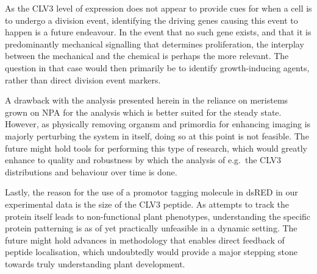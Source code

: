 As the CLV3 level of expression does not appear to provide cues for when a cell
is to undergo a division event, identifying the driving genes causing this
event to happen is a future endeavour. In the event that no such gene exists,
and that it is predominantly mechanical signalling that determines
proliferation, the interplay between the mechanical and the chemical is perhaps
the more relevant. The question in that case would then primarily be to identify
growth-inducing agents, rather than direct division event markers.

A drawback with the analysis presented herein in the reliance on meristems grown
on NPA for the analysis which is better suited for the steady state. However, as
physically removing organsm and primordia for enhancing imaging is majorly
perturbing the system in itself, doing so at this point is not feasible. The
future might hold tools for performing this type of research, which would
greatly enhance to quality and robustness by which the analysis of e.g.\ the
CLV3 distributions and behaviour over time is done.

Lastly, the reason for the use of a promotor tagging molecule in dsRED in our
experimental data is the size of the CLV3 peptide. As attempts to track the protein
itself leads to non-functional plant phenotypes, understanding the specific
protein patterning is as of yet practically unfeasible in a dynamic setting. The
future might hold advances in methodology that enables direct feedback of
peptide localisation, which undoubtedly would provide a major stepping stone
towards truly understanding plant development.

